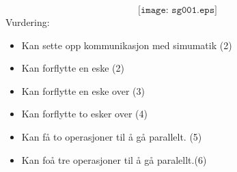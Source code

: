$$\texttt{[image: sg001.eps]}$$
Vurdering:
\begin{itemize}[noitemsep]
	\item Kan sette opp kommunikasjon med simumatik (2)
	\item Kan forflytte en eske (2)
	\item Kan forflytte en eske over (3)
	\item Kan forflytte to esker over (4)
	\item Kan få to operasjoner til å gå parallelt. (5)
	\item Kan foå tre operasjoner til å gå paralellt.(6)
\end{itemize}




